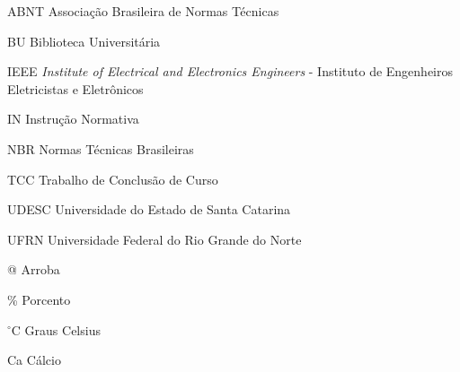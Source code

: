 
\listoffigures*
\cleardoublepage



\listoftables*
\cleardoublepage

\begin{siglas}
	\item[ABNT] Associação Brasileira de Normas Técnicas
	\item[BU] Biblioteca Universitária
	\item[IEEE] \textit{Institute of Electrical and Electronics Engineers} - Instituto de Engenheiros Eletricistas e Eletrônicos
	\item[IN] Instrução Normativa
	\item[NBR] Normas Técnicas Brasileiras
	\item[TCC] Trabalho de Conclusão de Curso
	\item[UDESC] Universidade do Estado de Santa Catarina	\item[UFRN] Universidade Federal do Rio Grande do Norte
\end{siglas}



\begin{simbolos}
  \item[@] Arroba
  \item[\%] Porcento
  \item[$^\circ$C] Graus Celsius
  \item[Ca] Cálcio
\end{simbolos}

